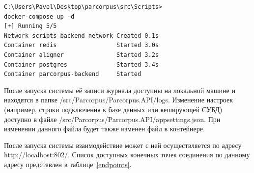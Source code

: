 \captionsetup{singlelinecheck = false, justification=raggedright}
\begin{lstlisting}[caption={Запуск системы}, label=docker-ex]
C:\Users\Pavel\Desktop\parcorpus\src\Scripts>
docker-compose up -d
[+] Running 5/5
Network scripts_backend-network Created 0.1s
Container redis                 Started 3.0s
Container aligner               Started 3.2s
Container postgres              Started 3.4s
Container parcorpus-backend     Started
\end{lstlisting}

После запуска системы её записи журнала доступны на локальной машине и находятся в папке /src/Parcorpus/Parcorpus.API/logs. Изменение настроек (например, строки подключения к базе данных или кеширующей СУБД) доступно в файле /src/Parcorpus/Parcorpus.API/appsettings.json. При изменении данного файла будет также изменен файл в контейнере.

После запуска системы взаимодействие может с ней осуществляется по адресу http://localhost:802/. Список доступных конечных точек соединения по данному адресу представлен в таблице~\ref{endpoints}.

